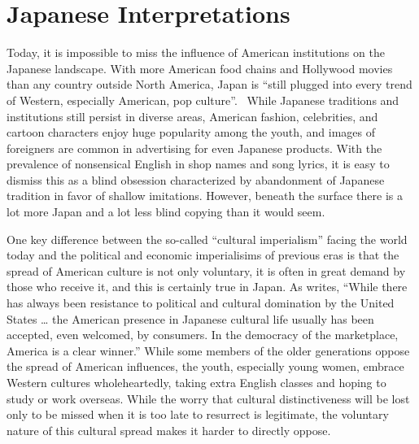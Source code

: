 \documentclass[12pt]{article}
\begin{document}
\section{Japanese Interpretations}

Today, it is impossible to miss the influence of American institutions on the Japanese landscape.  With more American food chains and Hollywood movies than any country outside North America, Japan is ``still plugged into every trend of Western, especially American, pop culture''.~\cChing{\citep[pg.\ 171]}
While Japanese traditions and institutions still persist in diverse areas, American fashion, celebrities, and cartoon characters enjoy huge popularity among the youth, and images of foreigners are common in advertising for even Japanese products.  With the prevalence of nonsensical English in shop names and song lyrics, it is easy to dismiss this as a blind obsession characterized by abandonment of Japanese tradition in favor of shallow imitations.  However, beneath the surface there is a lot more Japan and a lot less blind copying than it would seem.

One key difference between the so-called ``cultural imperialism'' facing the world today and the political and economic imperialisims of previous eras is that the spread of American culture is not only voluntary, it is often in great demand by those who receive it, and this is certainly true in Japan.  As \cBlues{\citet[pg.\ 28]} writes, 
``While there has always been resistance to political and cultural domination by the United States \ldots{} the American presence in Japanese cultural life usually has been accepted, even welcomed, by consumers.  In the democracy of the marketplace, America is a clear winner.''  While some members of the older generations oppose the spread of American influences, the youth, especially young women, embrace Western cultures wholeheartedly, taking extra English classes and hoping to study or work overseas.  While the worry that cultural distinctiveness will be lost only to be missed when it is too late to resurrect is legitimate, the voluntary nature of this cultural spread makes it harder to directly oppose.
\end{document}
